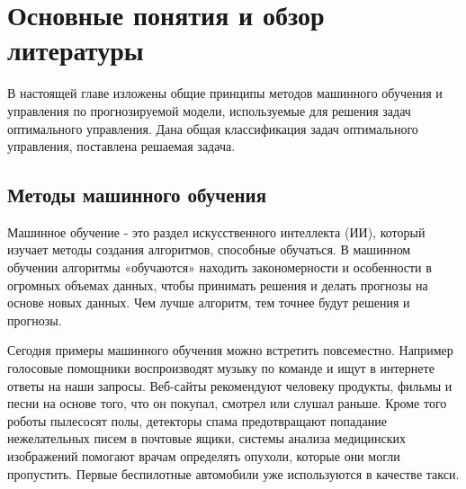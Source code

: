 \chapter{Основные понятия и обзор литературы}\label{chap1}

В настоящей главе изложены общие принципы методов машинного обучения и управления по прогнозируемой модели, используемые для решения задач оптимального управления.  Дана общая классификация задач оптимального управления, поставлена решаемая задача. 


\section{Методы машинного обучения}\label{1sec:machine-learning}

Машинное обучение - это раздел искусственного интеллекта (ИИ), который изучает методы создания алгоритмов, способные обучаться. В машинном обучении алгоритмы «обучаются» находить закономерности и особенности в огромных объемах данных, чтобы принимать решения и делать прогнозы на основе новых данных. Чем лучше алгоритм, тем точнее будут решения и прогнозы. 

Сегодня примеры машинного обучения можно встретить повсеместно. Например голосовые помощники воспроизводят музыку  по команде и ищут в интернете ответы на наши запросы. Веб-сайты рекомендуют человеку продукты, фильмы и песни на основе того, что он покупал, смотрел или слушал раньше. Кроме того роботы пылесосят полы, детекторы спама предотвращают попадание нежелательных писем в почтовые ящики, системы анализа медицинских изображений помогают врачам определять опухоли, которые они могли пропустить. Первые беспилотные автомобили уже используются в качестве такси.

